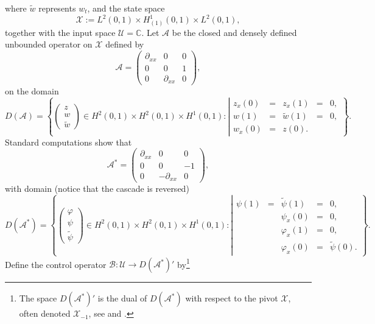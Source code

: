 \documentclass[10pt]{article}
\begin{document}
where $\tilde w$ represents $w_t$, and the state space
\[ \mathcal{X} := L^2(0,1) \times H^1_{(1)}(0,1) \times L^2(0,1) ,\]
 together with the input space $\mathcal{U} = \mathbb{C}$. Let $\mathcal{A}$ be the closed and densely defined unbounded operator on $\mathcal{X}$ defined  by
\[
\mathcal{A} = \left( \begin{array}{ccc}
\partial_{xx} & 0 & 0 \\
0 & 0 & 1 \\
0 & \partial_{xx} & 0
\end{array} \right),\]
on the domain
\begin{equation}\label{eq:primal_domain}
D(\mathcal{A}) = \left\lbrace \left( \begin{array}{c}
z \\ w \\ \tilde w
\end{array} \right) \in H^2(0,1) \times H^2(0,1) \times H^1(0,1) : \left\vert \begin{array}{ccccc}
z_x(0) &=& z_x(1) &=& 0, \\
w(1) &=&\tilde w(1) &=&0, \\
w_x(0) &=& z(0).
\end{array}\right. \right\rbrace.
\end{equation}
Standard computations show that 
\[
\mathcal{A}^* = \left( \begin{array}{ccc}
\partial_{xx} & 0 & 0 \\
0 & 0 & -1 \\
0 & -\partial_{xx} & 0
\end{array} \right),\]
with domain (notice that the cascade is reversed)
\begin{equation}\label{eq:adj_coupled}
D(\mathcal{A^*}) = \left\lbrace \left( \begin{array}{c}
\varphi \\ \psi \\ \tilde \psi 
\end{array} \right) \in H^2(0,1) \times H^2(0,1) \times H^1(0,1) : \left\vert \begin{array}{ccccc}
\psi(1) &=& \tilde \psi(1) &=& 0, \\
&& \psi_x(0) &=& 0,\\
&& \varphi_x(1) &=& 0, \\
&& \varphi_x(0) &=& \tilde \psi(0).
\end{array}\right. \right\rbrace.
\end{equation}
Define the  control operator $\mathcal{B} : \mathcal{U} \rightarrow D(\mathcal{A}^*)'$ by\footnote{The space $D(\mathcal{A}^*)'$ is the dual of $D(\mathcal{A}^*)$ with respect to the pivot $\mathcal{X}$, often denoted $\mathcal{X}_{-1}$, see \cite[\S 2.9]{tucsnak2009observation} and \cite[Chapitre III]{aubin}.}
\end{document}
